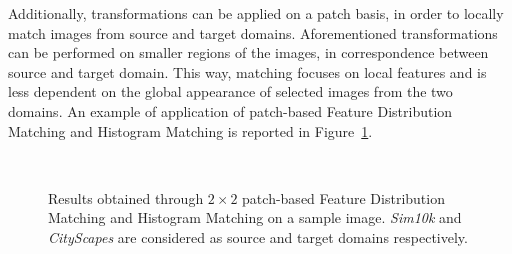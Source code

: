 \documentclass[%
    corpo=12pt,
    twoside,
    stile=classica,   
    tipotesi=magistrale,
    evenboxes,
    english,
	numerazioneromana,
]{toptesi}
\begin{document}
\medskip
Additionally, transformations can be applied on a patch basis, in order to locally match images from source and target domains. Aforementioned transformations can be performed on smaller regions of the images, in correspondence between source and target domain. This way, matching focuses on local features and is less dependent on the global appearance of selected images from the two domains. An example of application of patch-based Feature Distribution Matching and Histogram Matching is reported in Figure~\ref{fig:patchkis}.

\begin{figure}[ht]
	\centering
	\\
	\caption{Results obtained through $2\times 2$ patch-based Feature Distribution Matching and Histogram Matching on a sample image. \textit{Sim10k} and \textit{CityScapes} are considered as source and target domains respectively.}
	\label{fig:patchkis}
\end{figure}
\end{document}

